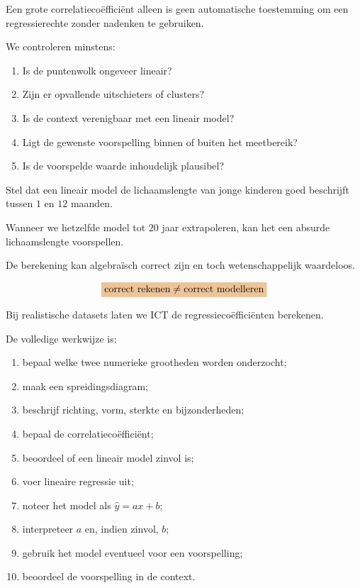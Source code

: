\documentclass{ximera}
\begin{document}
Een grote correlatiecoëfficiënt alleen is geen automatische toestemming
om een regressierechte zonder nadenken te gebruiken.

We controleren minstens:

\begin{enumerate}
  \item Is de puntenwolk ongeveer lineair?
  \item Zijn er opvallende uitschieters of clusters?
  \item Is de context verenigbaar met een lineair model?
  \item Ligt de gewenste voorspelling binnen of buiten het meetbereik?
  \item Is de voorspelde waarde inhoudelijk plausibel?
\end{enumerate}

\begin{voorbeeld}
Stel dat een lineair model de lichaamslengte van jonge kinderen goed
beschrijft tussen $1$ en $12$ maanden.

Wanneer we hetzelfde model tot $20$ jaar extrapoleren, kan het een
absurde lichaamslengte voorspellen.

De berekening kan algebraïsch correct zijn en toch wetenschappelijk
waardeloos.

\[
\important{
\text{correct rekenen}
\neq
\text{correct modelleren}
}
\]
\end{voorbeeld}



Bij realistische datasets laten we ICT de regressiecoëfficiënten
berekenen.

De volledige werkwijze is:

\begin{enumerate}
  \item bepaal welke twee numerieke grootheden worden onderzocht;
  \item maak een spreidingsdiagram;
  \item beschrijf richting, vorm, sterkte en bijzonderheden;
  \item bepaal de correlatiecoëfficiënt;
  \item beoordeel of een lineair model zinvol is;
  \item voer lineaire regressie uit;
  \item noteer het model als $\hat y=ax+b$;
  \item interpreteer $a$ en, indien zinvol, $b$;
  \item gebruik het model eventueel voor een voorspelling;
  \item beoordeel de voorspelling in de context.
\end{enumerate}
\end{document}
